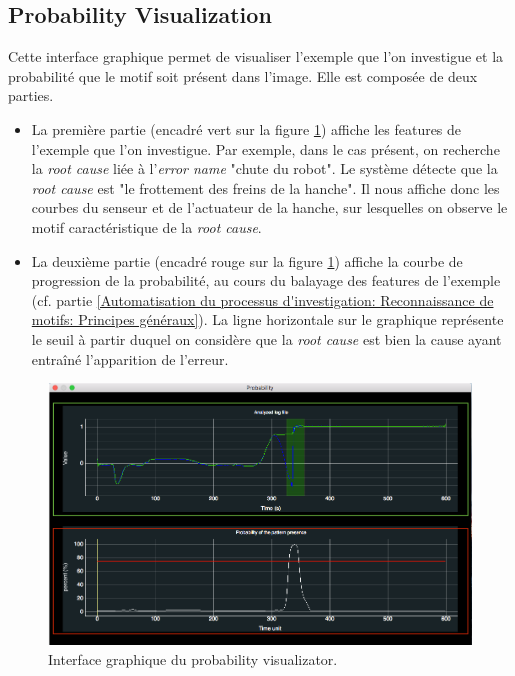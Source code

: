 \subsection{Probability Visualization}
\label{Industrialisation du produit: Outils graphiques: Probability Visualization}
Cette interface graphique permet de visualiser l'exemple que l'on investigue et la probabilité que le motif soit présent dans l'image. Elle est composée de deux parties. 
\begin{itemize}
	\item La première partie (encadré vert sur la figure \ref{fig:Interface graphique du probability visualizator}) affiche les features de l'exemple que l'on investigue. Par exemple, dans le cas présent, on recherche la \emph{root cause} liée à l'\emph{error name} "chute du robot". Le système détecte que la \emph{root cause} est "le frottement des freins de la hanche". Il nous affiche donc les courbes du senseur et de l'actuateur de la hanche, sur lesquelles on observe le motif caractéristique de la \emph{root cause}. 
	\item La deuxième partie (encadré rouge sur la figure \ref{fig:Interface graphique du probability visualizator}) affiche la courbe de progression de la probabilité, au cours du balayage des features de l'exemple (cf. partie \ref{Automatisation du processus d'investigation: Reconnaissance de motifs: Principes généraux}). La ligne horizontale sur le graphique représente le seuil à partir duquel on considère que la \emph{root cause} est bien la cause ayant entraîné l'apparition de l'erreur.
\end{itemize}

\begin{figure}[h]
	\centering\includegraphics[width=15cm]{images/proba_visu.png}
	\caption[Interface graphique du probability visualizator]{Interface graphique du probability visualizator.}
	\label{fig:Interface graphique du probability visualizator}
\end{figure}

